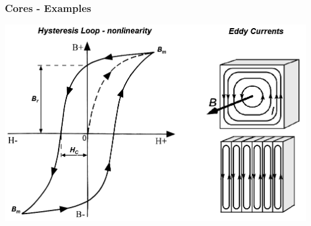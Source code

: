 \documentclass{beamer}
\begin{document}
	\begin{frame}
	\frametitle{Cores - Examples}
	\begin{center}
		\includegraphics[scale=0.38]{obr08_smycka.png}
	\end{center}
  \end{frame}
\end{document}
